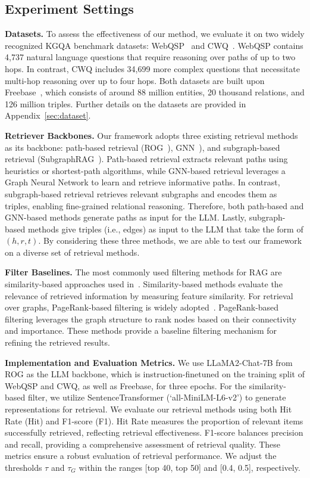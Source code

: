 \documentclass[11pt]{article}
\begin{document}
\subsection{Experiment Settings}
\textbf{Datasets.} To assess the effectiveness of our method, we evaluate it on two widely recognized KGQA benchmark datasets: WebQSP~\cite{yih2016value} and CWQ~\cite{talmor2018web}. WebQSP contains 4,737 natural language questions that require reasoning over paths of up to two hops. In contrast, CWQ includes 34,699 more complex questions that necessitate multi-hop reasoning over up to four hops. Both datasets are built upon Freebase~, which consists of around 88 million entities, 20 thousand relations, and 126 million triples. Further details on the datasets are provided in Appendix~\ref{sec:dataset}.

\textbf{Retriever Backbones.}
Our framework adopts three existing retrieval methods as its backbone: path-based retrieval (ROG~\cite{luo2024rog}), GNN~\cite{mavromatis2024gnn}), and subgraph-based retrieval (SubgraphRAG~\cite{li2024subgraphrag}). Path-based retrieval extracts relevant paths using heuristics or shortest-path algorithms, while GNN-based retrieval leverages a Graph Neural Network to learn and retrieve informative paths. In contrast, subgraph-based retrieval retrieves relevant subgraphs and encodes them as triples, enabling fine-grained relational reasoning. Therefore, both path-based and GNN-based methods generate paths as input for the LLM. Lastly, subgraph-based methods give triples (i.e., edges) as input to the LLM that take the form of \((h, r, t)\). By considering these three methods, we are able to test our framework on a diverse set of retrieval methods.

\textbf{Filter Baselines.}
The most commonly used filtering methods for RAG are similarity-based approaches used in~\cite{gao2025frag}. Similarity-based methods evaluate the relevance of retrieved information by measuring feature similarity. For retrieval over graphs, PageRank-based filtering is widely adopted~\cite{wang2024reasoning}. PageRank-based filtering leverages the graph structure to rank nodes based on their connectivity and importance. These methods provide a baseline filtering mechanism for refining the retrieved results.

\textbf{Implementation and Evaluation Metrics.}
We use LLaMA2-Chat-7B from ROG as the LLM backbone, which is instruction-finetuned on the training split of WebQSP and CWQ, as well as Freebase, for three epochs. For the similarity-based filter, we utilize SentenceTransformer (`all-MiniLM-L6-v2') to generate representations for retrieval.
We evaluate our retrieval methods using both Hit Rate (Hit) and F1-score (F1). 
Hit Rate measures the proportion of relevant items successfully retrieved, reflecting retrieval effectiveness. F1-score balances precision and recall, providing a comprehensive assessment of retrieval quality. These metrics ensure a robust evaluation of retrieval performance.
We adjust the thresholds \(\tau\) and \(\tau_G\) within the ranges [top 40, top 50] and [0.4, 0.5], respectively.
\end{document}
